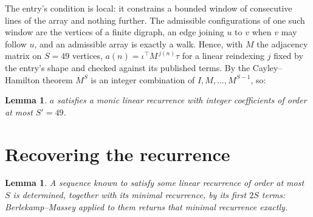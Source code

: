 \documentclass[11pt,a4paper]{article}
\theoremstyle{plain}
\newtheorem{lemma}[theorem]{Lemma}
\theoremstyle{definition}
\begin{document}
The entry's condition is local: it constrains a bounded window of consecutive lines of the
array and nothing further. The admissible configurations of one such window are the vertices
of a finite digraph, an edge joining $u$ to $v$ when $v$ may follow $u$, and an admissible
array is exactly a walk. Hence, with $M$ the adjacency matrix on $S=49$ vertices,
$a(n)=\iota^{\!\top}M^{\,j(n)}\tau$ for a linear reindexing $j$ fixed by the entry's shape
and checked against its published terms. By the Cayley--Hamilton theorem $M^{S}$ is an
integer combination of $I,M,\dots,M^{S-1}$, so:

\begin{lemma}\label{lem:cf}
$a$ satisfies a monic linear recurrence with integer coefficients of order at most
$S'=49$.
\end{lemma}

\section{Recovering the recurrence}

\begin{lemma}\label{lem:bm}
A sequence known to satisfy some linear recurrence of order at most $S$ is determined, together
with its minimal recurrence, by its first $2S$ terms: Berlekamp--Massey applied to them returns
that minimal recurrence exactly.
\end{lemma}
\end{document}
